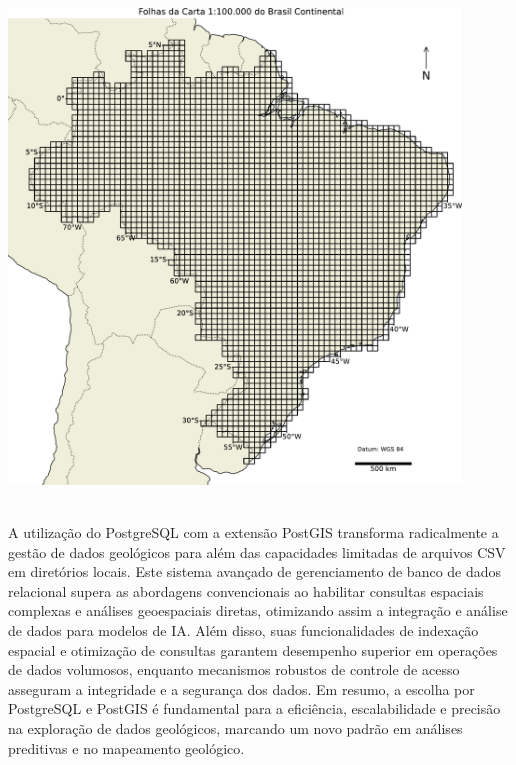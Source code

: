 {{        \centering
        \includegraphics[width=0.9\textwidth]{../../images/100k_brasilcont.pdf}
        \\[5mm]
\\[10mm]
        \justifying
        \setlength{\parindent}{1.5cm} %
\par{
    A utilização do PostgreSQL com a extensão PostGIS transforma radicalmente a gestão de dados geológicos para além das capacidades limitadas de arquivos CSV em diretórios locais. Este sistema avançado de gerenciamento de banco de dados relacional supera as abordagens convencionais ao habilitar consultas espaciais complexas e análises geoespaciais diretas, otimizando assim a integração e análise de dados para modelos de IA. Além disso, suas funcionalidades de indexação espacial e otimização de consultas garantem desempenho superior em operações de dados volumosos, enquanto mecanismos robustos de controle de acesso asseguram a integridade e a segurança dos dados. Em resumo, a escolha por PostgreSQL e PostGIS é fundamental para a eficiência, escalabilidade e precisão na exploração de dados geológicos, marcando um novo padrão em análises preditivas e no mapeamento geológico.
}
    }%
}%
